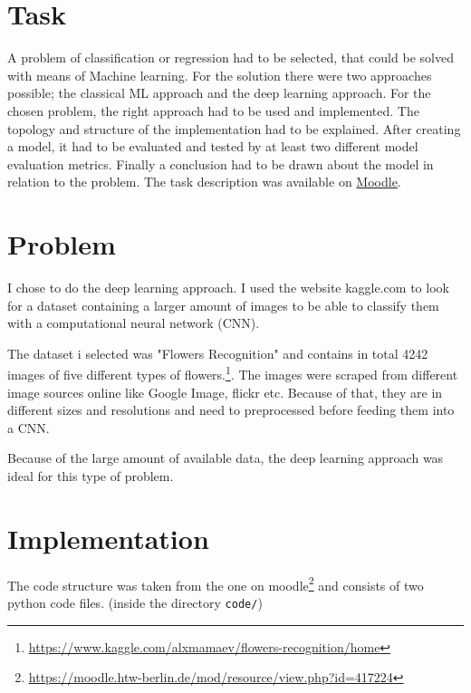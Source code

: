 \chapter{Task}

A problem of classification or regression had to be selected, that could be solved with means of Machine learning. For the solution there were two approaches possible; the classical ML approach and the deep learning approach. For the chosen problem, the right approach had to be used and implemented. The topology and structure of the implementation had to be explained. After creating a model, it had to be evaluated and tested by at least two different model evaluation metrics. Finally a conclusion had to be drawn about the model in relation to the problem. The task description was available on \href{https://moodle.htw-berlin.de/mod/assign/view.php?id=413684}{Moodle}.

\chapter{Problem}

I chose to do the deep learning approach. I used the website kaggle.com to look for a dataset containing a larger amount of images to be able to classify them with a computational neural network (CNN). 

The dataset i selected was "Flowers Recognition"  and contains in total 4242 images of five different types of flowers.\footnote{\label{foot:1}\href{https://www.kaggle.com/alxmamaev/flowers-recognition/home}{https://www.kaggle.com/alxmamaev/flowers-recognition/home}}. The images were scraped from different image sources online like Google Image, flickr etc. Because of that, they are in different sizes and resolutions and need to preprocessed before feeding them into a CNN. 

Because of the large amount of available data, the deep learning approach was ideal for this type of problem.

\chapter{Implementation}

The code structure was taken from the one on moodle\footnote{\label{foot:2}\href{https://moodle.htw-berlin.de/mod/resource/view.php?id=417224}{https://moodle.htw-berlin.de/mod/resource/view.php?id=417224}} and consists of two python code files. (inside the directory \texttt{code/}) 

